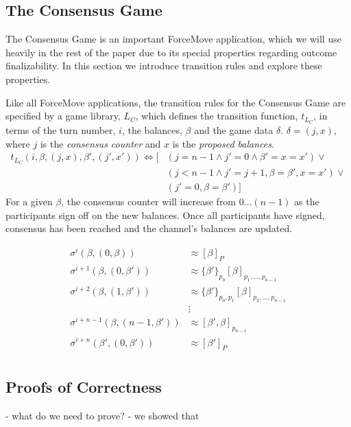 \documentclass{article}
\begin{document}
\subsection{The Consensus Game}

The Consensus Game is an important ForceMove application, which we will use heavily in the rest of the paper due to its special properties regarding outcome finalizability. In this section we introduce transition rules and explore these properties.

Like all ForceMove applications, the transition rules for the Consensus Game are specified by a game library, $L_C$, which defines the transition function, $t_{L_C}$, in terms of the turn number, $i$, the balances, $\beta$ and the game data $\delta$. $\delta = (j, x)$, where $j$ is the \textit{consensus counter} and $x$ is the \textit{proposed balances}. 
\begin{align*}
  t_{L_C}(i, \beta, (j, x), \beta', (j', x')) \Leftrightarrow
    [ & (j=n-1 \wedge j'= 0 \wedge \beta' = x = x')  \vee \\
    & (j < n-1 \wedge j' = j+1, \beta = \beta', x = x') \vee \\
    & (j'=0, \beta = \beta') ]
\end{align*}
For a given $\beta$, the consensus counter will increase from $0\dots (n-1)$ as the participants sign off on the new balances. Once all participants have signed, consensus has been reached and the channel's balances are updated.

  \begin{align*}
    \sigma^{i}(\beta, (0, \beta)) & \approx [\beta]_P \\
    \sigma^{i+1}(\beta, (0, \beta')) & \approx \{\beta'\}_{p_0}[\beta]_{p_1, ..., p_{n-1}} \\
    \sigma^{i+2}(\beta, (1, \beta')) & \approx \{\beta'\}_{p_0, p_1}[\beta]_{p_2, ..., p_{n-1}} \\
    &\vdots\\
    \sigma^{i+n-1}(\beta, (n-1, \beta')) & \approx [\beta', \beta]_{p_{n-1}} \\
    \sigma^{i+n}(\beta', (0, \beta')) & \approx [\beta']_{P} \\
  \end{align*}


\subsection{Proofs of Correctness}

- what do we need to prove?
- we showed that 
\end{document}
